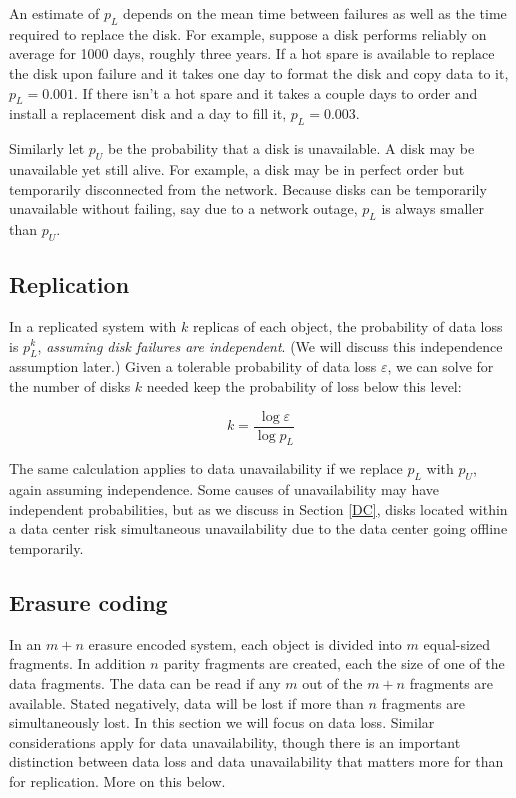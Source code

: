 \documentclass[11pt]{article}
\begin{document}
An estimate of $p_L$ depends on the mean time between failures as well as the time required to replace the disk. For example, suppose a disk performs reliably on average for 1000 days, roughly three years. If a hot spare is available to replace the disk upon failure and it takes one day to format the disk and copy data to it, $p_L = 0.001$. If there isn't a hot spare and it takes a couple days to order and install a replacement disk and a day to fill it, $p_L = 0.003$. 

Similarly let $p_U$ be the probability that a disk is unavailable. A disk may be unavailable yet still alive. For example, a disk may be in perfect order but temporarily disconnected from the network. Because disks can be temporarily unavailable without failing, say due to a network outage, $p_L$ is always smaller than $p_U$.

\subsection{Replication}

In a replicated system with $k$ replicas of each object, the probability of data loss is $p_L^k$, \emph{assuming disk failures are independent}. (We will discuss this independence assumption later.) Given a tolerable probability of data loss $\varepsilon$, we can solve for the number of disks $k$ needed keep the probability of loss below this level:

\begin{equation}
 k = \frac{\log \varepsilon}{\log p_L} \label{kreplication}
\end{equation}

The same calculation applies to data unavailability if we replace $p_L$ with $p_U$, again assuming independence. Some causes of unavailability may have independent probabilities, but as we discuss in Section \ref{DC}, disks located within a data center risk simultaneous unavailability due to the data center going offline temporarily.

\subsection{Erasure coding}

In an $m+n$ erasure encoded system, each object is divided into $m$ equal-sized fragments. In addition $n$ parity fragments are created, each the size of one of the data fragments. The data can be read if any $m$ out of the $m+n$ fragments are available. Stated negatively, data will be lost if more than $n$ fragments are simultaneously lost. In this section we will focus on data loss. Similar considerations apply for data unavailability, though there is an important distinction between data loss and data unavailability that matters more for than for replication. More on this below.
\end{document}
